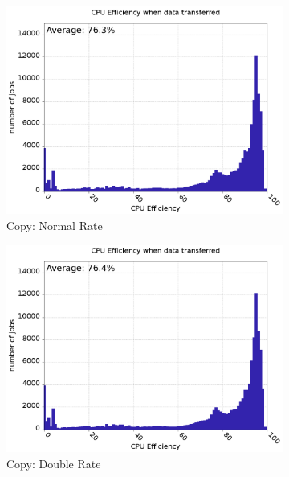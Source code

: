 \documentclass[a4paper]{jpconf}
\begin{document}
\begin{figure}
\begin{center}
    \begin{subfigure}{0.3\textwidth}
      \includegraphics[width=\textwidth]{figures/S_FP0_RP0CPUEff.png}
      \caption{Copy: Normal Rate\label{fig:cpuEffCopyN}}
    \end{subfigure}
    \begin{subfigure}{0.3\textwidth}
      \includegraphics[width=\textwidth]{figures/S_FP1_RP0CPUEff.png}
      \caption{Copy: Double Rate\label{fig:cpuEffCopyD}}
    \end{subfigure}
    \begin{subfigure}{0.3\textwidth}

\end{subfigure}
\end{center}
\end{figure}
\end{document}
